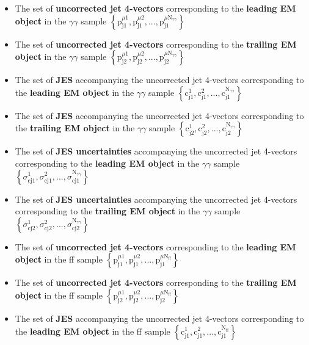 \documentclass[12pt, letterpaper]{report}
\begin{document}
\begin{itemize}
  \item The set of \textbf{uncorrected jet 4-vectors} corresponding to the \textbf{leading EM object} in the $\gamma\gamma$ sample $\left\{\mbox{p}_{\mbox{j}1}^{\mu1}, \mbox{p}_{\mbox{j}1}^{\mu2},...,\mbox{p}_{\mbox{j}1}^{\mu \mbox{N}_{\gamma\gamma}}\right\}$
  \item The set of \textbf{uncorrected jet 4-vectors} corresponding to the \textbf{trailing EM object} in the $\gamma\gamma$ sample $\left\{\mbox{p}_{\mbox{j}2}^{\mu1}, \mbox{p}_{\mbox{j}2}^{\mu2},...,\mbox{p}_{\mbox{j}2}^{\mu \mbox{N}_{\gamma\gamma}}\right\}$
  \item The set of \textbf{JES} accompanying the uncorrected jet 4-vectors corresponding to the \textbf{leading EM object} in the $\gamma\gamma$ sample $\left\{\mbox{c}_{\mbox{j}1}^{1}, \mbox{c}_{\mbox{j}1}^{2},...,\mbox{c}_{\mbox{j}1}^{\mbox{N}_{\gamma\gamma}}\right\}$
  \item The set of \textbf{JES} accompanying the uncorrected jet 4-vectors corresponding to the \textbf{trailing EM object} in the $\gamma\gamma$ sample $\left\{\mbox{c}_{\mbox{j}2}^{1}, \mbox{c}_{\mbox{j}2}^{2},...,\mbox{c}_{\mbox{j}2}^{\mbox{N}_{\gamma\gamma}}\right\}$
  \item The set of \textbf{JES uncertainties} accompanying the uncorrected jet 4-vectors corresponding to the \textbf{leading EM object} in the $\gamma\gamma$ sample $\left\{\sigma_{\mbox{cj}1}^{1}, \sigma_{\mbox{cj}1}^{2},...,\sigma_{\mbox{cj}1}^{\mbox{N}_{\gamma\gamma}}\right\}$
  \item The set of \textbf{JES uncertainties} accompanying the uncorrected jet 4-vectors corresponding to the \textbf{trailing EM object} in the $\gamma\gamma$ sample $\left\{\sigma_{\mbox{cj}2}^{1}, \sigma_{\mbox{cj}2}^{2},...,\sigma_{\mbox{cj}2}^{\mbox{N}_{\gamma\gamma}}\right\}$
  \item The set of \textbf{uncorrected jet 4-vectors} corresponding to the \textbf{leading EM object} in the ff sample $\left\{\mbox{p}_{\mbox{j}1}^{\mu1}, \mbox{p}_{\mbox{j}1}^{\mu2},...,\mbox{p}_{\mbox{j}1}^{\mu \mbox{N}_{\mbox{ff}}}\right\}$
  \item The set of \textbf{uncorrected jet 4-vectors} corresponding to the \textbf{trailing EM object} in the ff sample $\left\{\mbox{p}_{\mbox{j}2}^{\mu1}, \mbox{p}_{\mbox{j}2}^{\mu2},...,\mbox{p}_{\mbox{j}2}^{\mu \mbox{N}_{\mbox{ff}}}\right\}$
  \item The set of \textbf{JES} accompanying the uncorrected jet 4-vectors corresponding to the \textbf{leading EM object} in the ff sample $\left\{\mbox{c}_{\mbox{j}1}^{1}, \mbox{c}_{\mbox{j}1}^{2},...,\mbox{c}_{\mbox{j}1}^{\mbox{N}_{\mbox{ff}}}\right\}$

\end{itemize}
\end{document}
